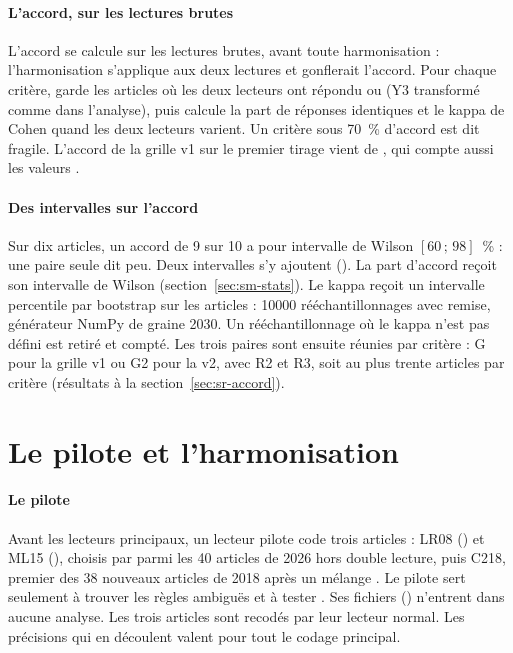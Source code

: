 \paragraph{L'accord, sur les lectures brutes}
L'accord se calcule sur les lectures brutes, avant toute harmonisation : l'harmonisation s'applique
aux deux lectures et gonflerait l'accord. Pour chaque critère,  garde les
articles où les deux lecteurs ont répondu  ou  (Y3 transformé comme dans
l'analyse), puis calcule la part de réponses identiques et le kappa de Cohen quand les deux lecteurs
varient. Un critère sous 70~\% d'accord est dit fragile. L'accord de la grille v1 sur le premier tirage
vient de , qui compte aussi les valeurs .

\paragraph{Des intervalles sur l'accord}
Sur dix articles, un accord de 9 sur 10 a pour intervalle de Wilson $[60\,;\,98]$~\% : une paire
seule dit peu. Deux intervalles s'y ajoutent (). La part d'accord reçoit son intervalle de Wilson
(section~\ref{sec:sm-stats}). Le kappa reçoit un intervalle percentile par bootstrap sur les articles :
\num{10000} rééchantillonnages avec remise, générateur NumPy de graine 2030. Un rééchantillonnage où
le kappa n'est pas défini est retiré et compté. Les trois paires sont ensuite réunies par critère : G
pour la grille v1 ou G2 pour la v2, avec R2 et R3, soit au plus trente articles par critère
(résultats à la section~\ref{sec:sr-accord}).

\section{Le pilote et l'harmonisation}\label{sec:sm-harmonisation}

\paragraph{Le pilote}
Avant les lecteurs principaux, un lecteur pilote code trois articles : LR08 () et
ML15 (), choisis par  parmi les 40 articles de 2026 hors double lecture, puis C218, premier des 38 nouveaux articles de 2018 après un mélange . Le
pilote sert seulement à trouver les règles ambiguës et à tester . Ses fichiers
() n'entrent dans aucune analyse. Les trois articles sont recodés par leur
lecteur normal. Les précisions qui en découlent valent pour tout le codage principal.

